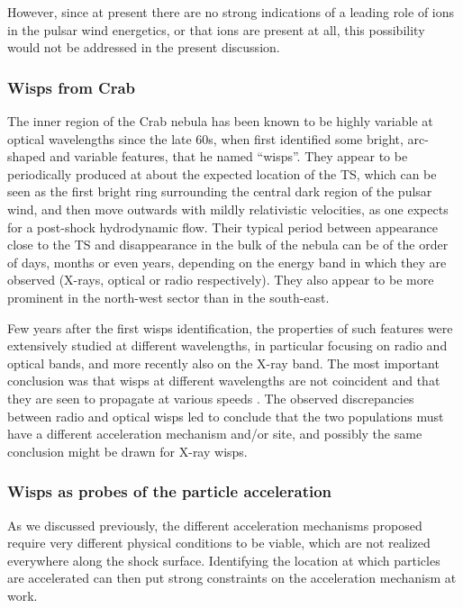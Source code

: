 However, since at present there are no strong indications of a leading role of ions in the pulsar wind energetics, or that ions are present at all, this possibility would not be addressed in the present discussion.

\subsubsection{Wisps from Crab}

The inner region of the Crab nebula has been known to be highly variable at optical wavelengths since the late 60s, when \citet{Scargle:1969} first identified some bright, arc-shaped and variable features, that he named \enquote{wisps}. 
They appear to be periodically produced at about the expected location of the TS, which can be seen as the first bright ring surrounding the central dark region of the pulsar wind, and then move outwards with mildly relativistic velocities, as one expects for a post-shock hydrodynamic flow. 
Their typical period between appearance close to the TS and disappearance in the bulk of the nebula can be of the order of days, months or even years, depending on the energy band in which they are observed (X-rays, optical or radio respectively).
They also appear to be more prominent in the north-west sector than in the south-east.

Few years after the first wisps identification, the properties of such features were extensively studied at different wavelengths, in particular focusing on radio and optical bands, and more recently also on the X-ray band. 
The most important conclusion was that wisps at different wavelengths are not coincident and that they are seen to propagate at various speeds \citep{Bietenholz:2004,Schweizer:2013}.
The observed discrepancies between radio and optical wisps led \citet{Bietenholz:2004} to conclude that the two populations must have a different acceleration mechanism and/or site, and possibly the same conclusion might be drawn for X-ray wisps.


\subsubsection{Wisps as probes of the particle acceleration}

As we discussed previously, the different acceleration mechanisms proposed require very different physical conditions to be viable, which are not realized everywhere along the shock surface. Identifying the location at which particles are accelerated can then put strong constraints on the acceleration mechanism at work.

